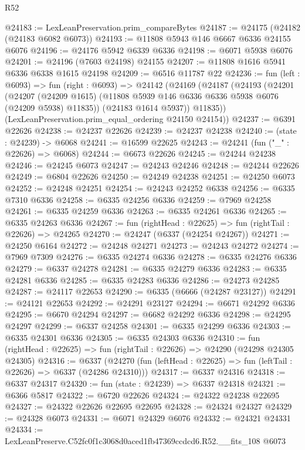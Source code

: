 \begin{lexlean}{R52}
\begin{coremodule}
@24183 := LexLeanPreservation.prim_compareBytes
@24187 := @24175 (@24182 (@24183 @6082 @6073))
@24193 := @11808 @5943 @146 @6667 @6336 @24155 @6076
@24196 := @24176 @5942 @6339 @6336
@24198 := @6071 @5938 @6076
@24201 := @24196 (@7603 @24198) @24155
@24207 := @11808 @1616 @5941 @6336 @6338 @1615 @24198
@24209 := @6516 @11787 @22
@24236 := fun (left : @6093) =>
  fun (right : @6093) =>
  @24142
    (@24169
      (@24187
        (@24193
          (@24201
            (@24207
              (@24209 @1615)
              (@11808 @5939 @146 @6336 @6336 @5938 @6076 (@24209 @5938) @11835))
            (@24183 @1614 @5937))
          @11835))
      (LexLeanPreservation.prim_equal_ordering @24150 @24154))
@24237 := @6391 @22626
@24238 := @24237 @22626
@24239 := @24237 @24238
@24240 := (state : @24239) -> @6068
@24241 := @16599 @22625
@24243 := @24241 (fun ("_" : @22626) => @6068)
@24244 := @6673 @22626
@24245 := @24244 @24238
@24246 := @24245 @6073
@24247 := @24243 @24246
@24248 := @24244 @22626
@24249 := @6804 @22626
@24250 := @24249 @24238
@24251 := @24250 @6073
@24252 := @24248 @24251
@24254 := @24243 @24252 @6338
@24256 := @6335 @7310 @6336
@24258 := @6335 @24256 @6336
@24259 := @7969 @24258
@24261 := @6335 @24259 @6336
@24263 := @6335 @24261 @6336
@24265 := @6335 @24263 @6336
@24267 := fun (rightHead : @22625) => fun (rightTail : @22626) => @24265
@24270 := @24247 (@6337 (@24254 @24267))
@24271 := @24250 @6164
@24272 := @24248 @24271
@24273 := @24243 @24272
@24274 := @7969 @7309
@24276 := @6335 @24274 @6336
@24278 := @6335 @24276 @6336
@24279 := @6337 @24278
@24281 := @6335 @24279 @6336
@24283 := @6335 @24281 @6336
@24285 := @6335 @24283 @6336
@24286 := @24273 @24285
@24287 := @24117 @22653
@24290 := @6335 (@6666 (@24287 @23127))
@24291 := @24121 @22653
@24292 := @24291 @23127
@24294 := @6671 @24292 @6336
@24295 := @6670 @24294
@24297 := @6682 @24292 @6336
@24298 := @24295 @24297
@24299 := @6337 @24258
@24301 := @6335 @24299 @6336
@24303 := @6335 @24301 @6336
@24305 := @6335 @24303 @6336
@24310 := fun (rightHead : @22625) => fun (rightTail : @22626) => @24290 (@24298 @24305 @24305)
@24316 := @6337
    (@24270 (fun (leftHead : @22625) => fun (leftTail : @22626) => @6337 (@24286 @24310)))
@24317 := @6337 @24316
@24318 := @6337 @24317
@24320 := fun (state : @24239) => @6337 @24318
@24321 := @6366 @5817
@24322 := @6720 @22626
@24324 := @24322 @24238 @22695
@24327 := @24322 @22626 @22695 @22695
@24328 := @24324 @24327
@24329 := @24328 @6073
@24331 := @6071 @24329 @6076
@24332 := @24321 @24331
@24334 := LexLeanPreserve.C52fc0f1c3068d0aced1fb47369ccdcd6.R52.__fits_108 @6073

\end{coremodule}
\end{lexlean}
